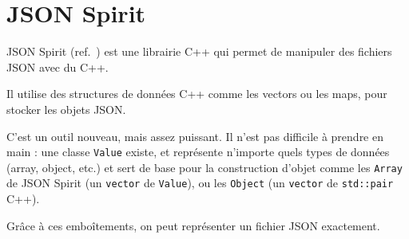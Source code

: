 \section{JSON Spirit}
JSON Spirit (ref.~\cite{JsonSpirit}) est une librairie C++ qui permet de manipuler des fichiers JSON avec du C++.

Il utilise des structures de données C++ comme les vectors ou les maps, pour stocker les objets JSON. 

C'est un outil nouveau, mais assez puissant. Il n'est pas difficile à prendre en main : une classe \verb|Value| existe, et représente n'importe quels types de données (array, object, etc.) et sert de base pour la construction d'objet comme les \verb|Array| de JSON Spirit (un \verb|vector| de \verb|Value|), ou les \verb|Object| (un \verb|vector| de \verb|std::pair| C++).

Grâce à ces emboîtements, on peut représenter un fichier JSON exactement.
